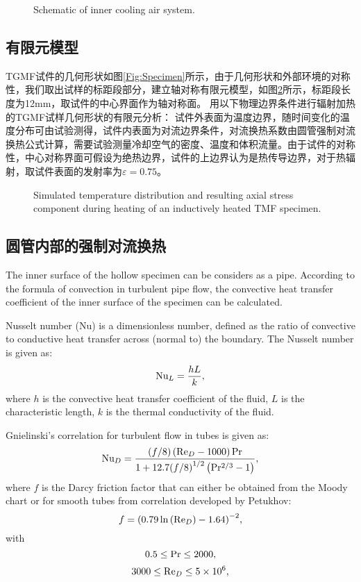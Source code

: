 \documentclass{article}
\begin{document}
\begin{figure}[!htp]
\caption{Schematic of inner cooling air system.}
\label{Fig:inner_cooling}
\end{figure}

\subsection{有限元模型}
TGMF试件的几何形状如图\ref{Fig:Specimen}所示，由于几何形状和外部环境的对称性，我们取出试样的标距段部分，建立轴对称有限元模型，如图\ref{Fig:FEM}所示，标距段长度为12mm，取试件的中心界面作为轴对称面。
用以下物理边界条件进行辐射加热的TGMF试样几何形状的有限元分析：
试件外表面为温度边界，随时间变化的温度分布可由试验测得，试件内表面为对流边界条件，对流换热系数由圆管强制对流换热公式计算，需要试验测量冷却空气的密度、温度和体积流量。由于试件的对称性，中心对称界面可假设为绝热边界，试件的上边界认为是热传导边界，对于热辐射，取试件表面的发射率为$\varepsilon=0.75$。

\begin{figure}[!htp]
\caption{Simulated temperature distribution and resulting axial stress component during heating of an inductively heated TMF specimen.}
\label{Fig:FEM}
\end{figure}

\subsection{圆管内部的强制对流换热}
The inner surface of the hollow specimen can be considers as a pipe.
According to the formula of convection in turbulent pipe flow, the convective heat transfer coefficient of the inner surface of the specimen can be calculated.

Nusselt number (Nu) is a dimensionless number, defined as the ratio of convective to conductive heat transfer across (normal to) the boundary.
The Nusselt number is given as:
\[{\rm{N}}{{\rm{u}}_L} = \frac{{hL}}{k},\]
where $h$ is the convective heat transfer coefficient of the fluid, $L$ is the characteristic length, $k$ is the thermal conductivity of the fluid.

Gnielinski's correlation for turbulent flow in tubes is given as:
\[{\rm{N}}{{\rm{u}}_D} = \frac{{\left( {f/8} \right)\left( {{\rm{R}}{{\rm{e}}_D} - 1000} \right){\rm{Pr}}}}{{1 + 12.7{{(f/8)}^{1/2}}\left( {{\rm{P}}{{\rm{r}}^{2/3}} - 1} \right)}},\]
where $f$ is the Darcy friction factor that can either be obtained from the Moody chart or for smooth tubes from correlation developed by Petukhov:
\[f = {\left( {0.79\ln \left( {{\rm{R}}{{\rm{e}}_D}} \right) - 1.64} \right)^{ - 2}},\]
with
\[0.5 \le {\rm{Pr}} \le 2000,\]
\[3000 \le {\rm{R}}{{\rm{e}}_D} \le 5 \times {10^6},\]
\end{document}
